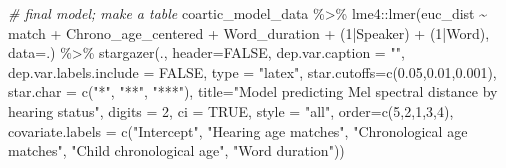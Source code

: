\documentclass[
]{article}
\newenvironment{Shaded}{\begin{snugshade}}{\end{snugshade}}
\newcommand{\AttributeTok}[1]{\textcolor[rgb]{0.77,0.63,0.00}{#1}}
\newcommand{\CommentTok}[1]{\textcolor[rgb]{0.56,0.35,0.01}{\textit{#1}}}
\newcommand{\ConstantTok}[1]{\textcolor[rgb]{0.00,0.00,0.00}{#1}}
\newcommand{\DecValTok}[1]{\textcolor[rgb]{0.00,0.00,0.81}{#1}}
\newcommand{\FloatTok}[1]{\textcolor[rgb]{0.00,0.00,0.81}{#1}}
\newcommand{\FunctionTok}[1]{\textcolor[rgb]{0.00,0.00,0.00}{#1}}
\newcommand{\NormalTok}[1]{#1}
\newcommand{\SpecialCharTok}[1]{\textcolor[rgb]{0.00,0.00,0.00}{#1}}
\newcommand{\StringTok}[1]{\textcolor[rgb]{0.31,0.60,0.02}{#1}}
\begin{document}
\begin{Shaded}
\begin{Highlighting}[]
\CommentTok{\# final model; make a table }
\NormalTok{coartic\_model\_data }\SpecialCharTok{\%\textgreater{}\%}
\NormalTok{  lme4}\SpecialCharTok{::}\FunctionTok{lmer}\NormalTok{(euc\_dist }\SpecialCharTok{\textasciitilde{}}\NormalTok{ match }\SpecialCharTok{+}\NormalTok{ Chrono\_age\_centered }\SpecialCharTok{+}\NormalTok{ Word\_duration }\SpecialCharTok{+}\NormalTok{ (}\DecValTok{1}\SpecialCharTok{|}\NormalTok{Speaker) }\SpecialCharTok{+}\NormalTok{ (}\DecValTok{1}\SpecialCharTok{|}\NormalTok{Word), }\AttributeTok{data=}\NormalTok{.) }\SpecialCharTok{\%\textgreater{}\%}
  \FunctionTok{stargazer}\NormalTok{(., }\AttributeTok{header=}\ConstantTok{FALSE}\NormalTok{, }
            \AttributeTok{dep.var.caption =} \StringTok{""}\NormalTok{, }
            \AttributeTok{dep.var.labels.include =} \ConstantTok{FALSE}\NormalTok{,  }
            \AttributeTok{type =} \StringTok{"latex"}\NormalTok{,}
            \AttributeTok{star.cutoffs=}\FunctionTok{c}\NormalTok{(}\FloatTok{0.05}\NormalTok{,}\FloatTok{0.01}\NormalTok{,}\FloatTok{0.001}\NormalTok{), }
            \AttributeTok{star.char =} \FunctionTok{c}\NormalTok{(}\StringTok{"*"}\NormalTok{, }\StringTok{"**"}\NormalTok{, }\StringTok{"***"}\NormalTok{),}
            \AttributeTok{title=}\StringTok{"Model predicting Mel spectral distance by hearing status"}\NormalTok{,  }
            \AttributeTok{digits =} \DecValTok{2}\NormalTok{, }
            \AttributeTok{ci =} \ConstantTok{TRUE}\NormalTok{, }
            \AttributeTok{style =} \StringTok{"all"}\NormalTok{,}
            \AttributeTok{order=}\FunctionTok{c}\NormalTok{(}\DecValTok{5}\NormalTok{,}\DecValTok{2}\NormalTok{,}\DecValTok{1}\NormalTok{,}\DecValTok{3}\NormalTok{,}\DecValTok{4}\NormalTok{),}
            \AttributeTok{covariate.labels =} \FunctionTok{c}\NormalTok{(}\StringTok{"Intercept"}\NormalTok{, }\StringTok{"Hearing age matches"}\NormalTok{, }\StringTok{"Chronological age matches"}\NormalTok{,  }\StringTok{"Child chronological age"}\NormalTok{, }\StringTok{"Word duration"}\NormalTok{))}
\end{Highlighting}
\end{Shaded}
\end{document}
